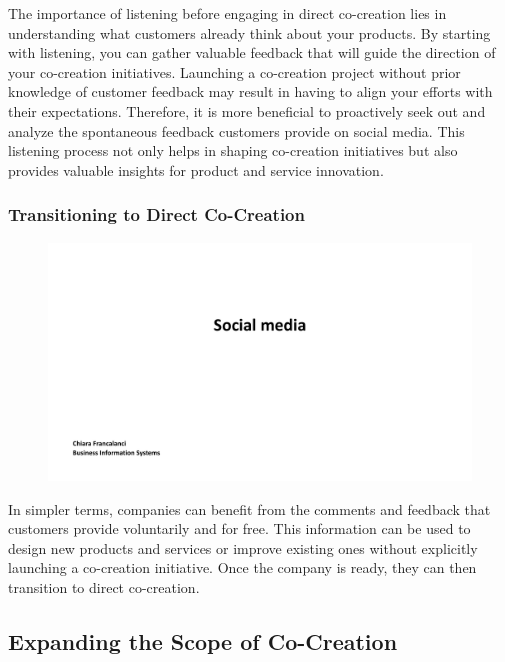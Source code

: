 The importance of listening before engaging in direct co-creation lies
in understanding what customers already think about your products. By
starting with listening, you can gather valuable feedback that will
guide the direction of your co-creation initiatives. Launching a
co-creation project without prior knowledge of customer feedback may
result in having to align your efforts with their expectations.
Therefore, it is more beneficial to proactively seek out and analyze the
spontaneous feedback customers provide on social media. This listening
process not only helps in shaping co-creation initiatives but also
provides valuable insights for product and service innovation.

\subsubsection{Transitioning to Direct
    Co-Creation}\label{transitioning-to-direct-co-creation}

\begin{figure}[!h]
    \centering
    \includegraphics[page=13, trim = 1cm 6cm 3cm 4cm, clip, width=\textwidth]{images/04 - Social_Media.pdf}
\end{figure}

In simpler terms, companies can benefit from the comments and feedback
that customers provide voluntarily and for free. This information can be
used to design new products and services or improve existing ones
without explicitly launching a co-creation initiative. Once the company
is ready, they can then transition to direct co-creation.

\subsection{Expanding the Scope of
    Co-Creation}\label{expanding-the-scope-of-co-creation}

